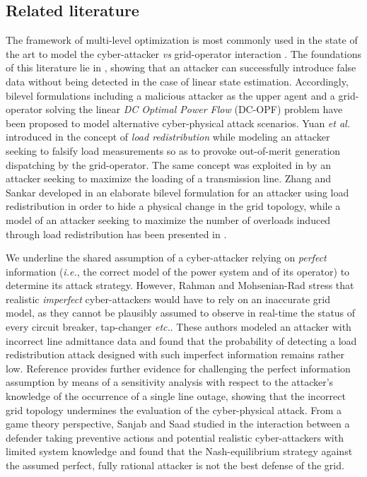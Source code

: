 \documentclass{IEEEtran4PSCC}
\begin{document}
\subsection{Related literature}
The framework of multi-level optimization is most commonly used in the state of the art to model the cyber-attacker \textit{vs} grid-operator interaction \cite{Zhang2021,he2016}.  The foundations of this literature lie in \cite{liu2011}, showing that an attacker can successfully introduce false data without being detected in the case of linear state estimation. Accordingly, bilevel formulations including a malicious attacker as the upper agent and a grid-operator solving the linear \emph{DC Optimal Power Flow} (DC-OPF) problem have been proposed to model alternative cyber-physical attack scenarios. Yuan \textit{et al.} introduced  {in  \cite{yuan2011}} the concept of \emph{load redistribution} while modeling an attacker seeking to  falsify load measurements so as to provoke  out-of-merit generation dispatching by the grid-operator. The same concept was exploited in \cite{liang2015} by an attacker seeking to maximize the loading of a transmission line.  Zhang and Sankar developed  {in  \cite{zhang2016}} an elaborate bilevel formulation for an attacker using load redistribution in order to hide a physical change in the grid topology, while a model of an attacker seeking to maximize the number of overloads induced through load redistribution has been presented in \cite{tian2019}.
  
We underline the  shared assumption of a cyber-attacker relying on \emph{perfect} information (\textit{i.e.}, the correct model of the power system and of its operator) to determine its attack strategy. However, Rahman and Mohsenian-Rad \cite{rahman2012}  stress that realistic \emph{imperfect} cyber-attackers would have to rely on an inaccurate grid model, as they cannot be plausibly assumed to observe in real-time the status of every circuit breaker, tap-changer  \textit{etc.}.  These authors modeled an attacker with incorrect line admittance data and found that the probability of detecting a load redistribution attack designed with  such imperfect information remains rather low.  Reference \cite{zhang2018} provides further evidence for challenging the perfect information assumption by means of a sensitivity analysis with respect to the attacker's knowledge of the occurrence of a single line outage, showing that the incorrect grid topology  undermines the evaluation of the cyber-physical attack.  From a game theory perspective, Sanjab and Saad studied  {in \cite{anibal}} the interaction between a defender taking preventive actions and potential realistic cyber-attackers with limited system knowledge and found that the Nash-equilibrium strategy against the assumed perfect, fully rational attacker is not the best defense of the grid.
\end{document}
